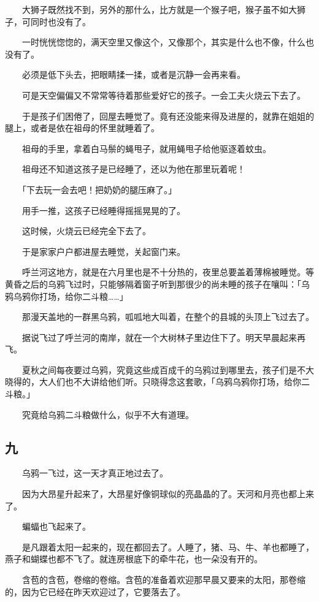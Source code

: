 \documentclass[UTF8]{ctexart}
\begin{document}
　　大狮子既然找不到，另外的那什么，比方就是一个猴子吧，猴子虽不如大狮子，可同时也没有了。

　　一时恍恍惚惚的，满天空里又像这个，又像那个，其实是什么也不像，什么也没有了。

　　必须是低下头去，把眼睛揉一揉，或者是沉静一会再来看。

　　可是天空偏偏又不常常等待着那些爱好它的孩子。一会工夫火烧云下去了。

　　于是孩子们困倦了，回屋去睡觉了。竟有还没能来得及进屋的，就靠在姐姐的腿上，或者是依在祖母的怀里就睡着了。

　　祖母的手里，拿着白马鬃的蝇甩子，就用蝇甩子给他驱逐着蚊虫。

　　祖母还不知道这孩子是已经睡了，还以为他在那里玩着呢！

　　「下去玩一会去吧！把奶奶的腿压麻了。」

　　用手一推，这孩子已经睡得摇摇晃晃的了。

　　这时候，火烧云已经完全下去了。

　　于是家家户户都进屋去睡觉，关起窗门来。

　　呼兰河这地方，就是在六月里也是不十分热的，夜里总要盖着薄棉被睡觉。等黄昏之后的乌鸦飞过时，只能够隔着窗子听到那很少的尚未睡的孩子在嚷叫：「乌鸦乌鸦你打场，给你二斗粮……」

　　那漫天盖地的一群黑乌鸦，呱呱地大叫着，在整个的县城的头顶上飞过去了。

　　据说飞过了呼兰河的南岸，就在一个大树林子里边住下了。明天早晨起来再飞。

　　夏秋之间每夜要过乌鸦，究竟这些成百成千的乌鸦过到哪里去，孩子们是不大晓得的，大人们也不大讲给他们听。只晓得念这套歌，「乌鸦乌鸦你打场，给你二斗粮。」

　　究竟给乌鸦二斗粮做什么，似乎不大有道理。

\subsection{九}

　　乌鸦一飞过，这一天才真正地过去了。

　　因为大昂星升起来了，大昂星好像铜球似的亮晶晶的了。天河和月亮也都上来了。

　　蝙蝠也飞起来了。

　　是凡跟着太阳一起来的，现在都回去了。人睡了，猪、马、牛、羊也都睡了，燕子和蝴蝶也都不飞了。就连房根底下的牵牛花，也一朵没有开的。

　　含苞的含苞，卷缩的卷缩。含苞的准备着欢迎那早晨又要来的太阳，那卷缩的，因为它已经在昨天欢迎过了，它要落去了。
\end{document}

